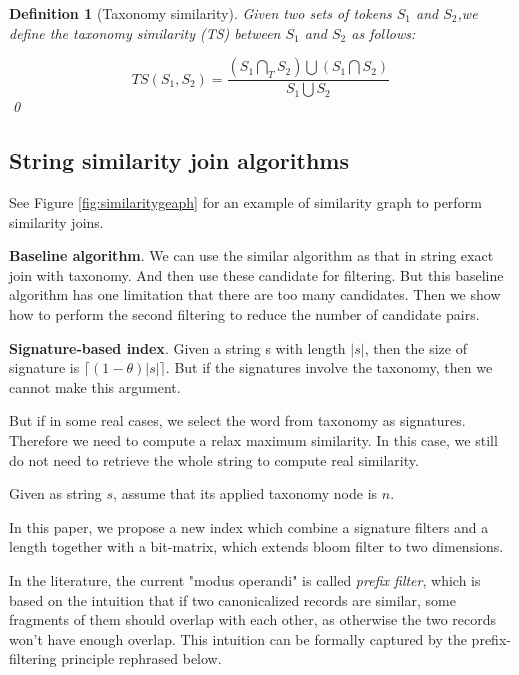 \documentclass{sig-alternate}
\newtheorem{defi}[theorem]{Definition}
\newif\ifqedwritten
\newenvironment{definition}[1][]{\begin{defi}[#1]\upshape\qedwrittenfalse}{\qedhere\end{defi}}
\newcommand{\qedhere}{\ifqedwritten\else\ifmmode\tag*{\qed}\else\hfill\qed\fi\global\qedwrittentrue\fi}
\begin{document}
\begin{definition}[Taxonomy similarity]   Given two sets of tokens $S_1$ and $S_2$,we define the taxonomy similarity (TS) between $S_1$ and $S_2$ as follows:

\begin{equation}
TS(S_1,S_2)=  \frac{(S_1 \bigcap_T S_2) \bigcup (S_1 \bigcap S_2) }{S_1 \bigcup S_2}
\end{equation} \end{definition}

\subsection{String similarity join algorithms}



See Figure \ref{fig:similaritygeaph} for an example of similarity graph to perform similarity joins.

\textbf{Baseline algorithm}. We can use the similar algorithm as that in string exact join with taxonomy. And then use these candidate for filtering. But this baseline algorithm has one limitation that there are too many candidates. Then we show how to perform the second filtering to reduce the number of candidate pairs.

\textbf{Signature-based index}. Given a string s with length $|s|$, then the size of signature is $\lceil (1-\theta)|s| \rceil$. But if the signatures involve the taxonomy, then we cannot make this argument.

But if in some real cases, we select the word from taxonomy as signatures. Therefore we need to compute a relax maximum similarity. In this case, we still do not need to retrieve the whole string to compute real similarity.

Given as string $s$, assume that its applied taxonomy node is $n$.

In this paper, we propose a new index which combine a signature filters and a length together with a bit-matrix, which extends bloom filter to two dimensions.

In the literature, the current "modus operandi" is called \textit{prefix filter}, which is based on the intuition that if two canonicalized records are similar, some fragments of them should overlap with each other, as otherwise the two records
won't have enough overlap. This intuition can be formally captured by the prefix-filtering
principle \cite{conf/icde/ChaudhuriGK06} rephrased below.
\end{document}
